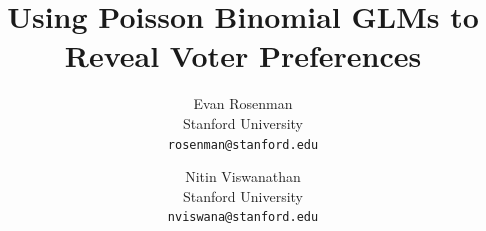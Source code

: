 \documentclass[10pt, letterpaper]{article}
\begin{document}
\title{Using Poisson Binomial GLMs to Reveal Voter Preferences}

\author{Evan Rosenman\\
Stanford University\\
{\tt\small rosenman@stanford.edu}
\and
Nitin Viswanathan\\
Stanford University\\
{\tt\small nviswana@stanford.edu}
}

\maketitle


\end{document}

